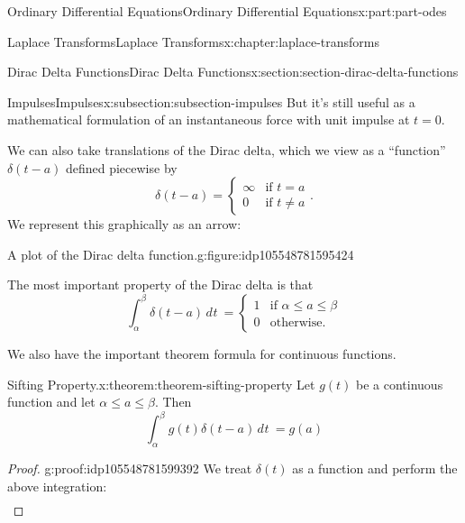 \documentclass[oneside,10pt,]{book}
\numberwithin{equation}{part}
\newcommand{\dd}[2][]{\, d^{#1} #2\ }
\newcommand{\Int}[2]{\int_{#1}^{#2}}
\newcommand{\amp}{&}
\begin{document}
\begin{partptx}{Ordinary Differential Equations}{}{Ordinary Differential Equations}{}{}{x:part:part-odes}
\begin{chapterptx}{Laplace Transforms}{}{Laplace Transforms}{}{}{x:chapter:laplace-transforms}
\begin{sectionptx}{Dirac Delta Functions}{}{Dirac Delta Functions}{}{}{x:section:section-dirac-delta-functions}
\begin{subsectionptx}{Impulses}{}{Impulses}{}{}{x:subsection:subsection-impulses}
 But it's still useful as a mathematical formulation of an instantaneous force with unit impulse at \(t=0\).%
\par
We can also take translations of the Dirac delta, which we view as a ``function'' \(\delta(t-a)\) defined piecewise by%
\begin{equation*}
\delta(t-a)=
\begin{cases}
\infty \amp\text{if }t=a\\
0 \amp\text{if }t\neq a
\end{cases}.
\end{equation*}
We represent this graphically as an arrow: \begin{figureptx}{A plot of the Dirac delta function.}{g:figure:idp105548781595424}{}%
\begin{image}{0}{1}{0}%
%
\end{image}%
\tcblower
\end{figureptx}%
%
\par
The most important property of the Dirac delta is that%
\begin{equation*}
\Int{\alpha}{\beta}\delta(t-a)\dd{t} = 
\begin{cases}
1 \amp\text{if }\alpha\leq a\leq\beta \\
0 \amp\text{otherwise.}  
\end{cases}
\end{equation*}
%
\par
We also have the important theorem formula for continuous functions.%
\begin{theorem}{Sifting Property.}{}{x:theorem:theorem-sifting-property}%
Let \(g(t)\) be a continuous function and let \(\alpha\leq a\leq\beta\). Then%
\begin{equation*}
\Int{\alpha}{\beta}g(t)\delta(t-a)\dd{t} = g(a)
\end{equation*}
%
\end{theorem}
\begin{proof}{}{g:proof:idp105548781599392}
We treat \(\delta(t)\) as a function and perform the above integration:%
\begin{align*}
\end{align*}

\end{proof}
\end{subsectionptx}
\end{sectionptx}
\end{chapterptx}
\end{partptx}
\end{document}
